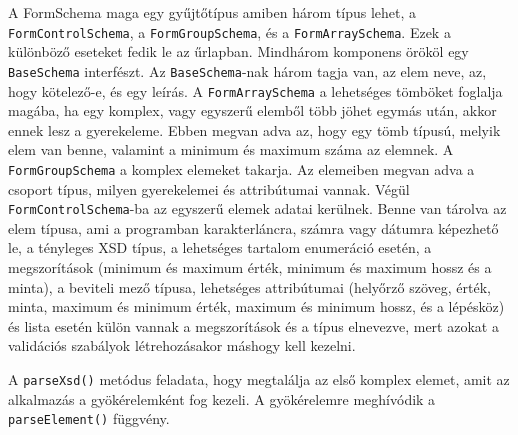 
A FormSchema maga egy gyűjtőtípus amiben három típus lehet, a \texttt{FormControlSchema}, a \texttt{FormGroupSchema}, és a \texttt{FormArraySchema}. Ezek a különböző eseteket fedik le az űrlapban. Mindhárom komponens örököl egy \texttt{BaseSchema} interfészt. Az \texttt{BaseSchema}-nak három tagja van, az elem neve, az, hogy kötelező-e, és egy leírás. A \texttt{FormArraySchema} a lehetséges tömböket foglalja magába, ha egy komplex, vagy egyszerű elemből több jöhet egymás után, akkor ennek lesz a gyerekeleme. Ebben megvan adva az, hogy egy tömb típusú, melyik elem van benne, valamint a minimum és maximum száma az elemnek. A \texttt{FormGroupSchema} a komplex elemeket takarja. Az elemeiben megvan adva a csoport típus, milyen gyerekelemei és attribútumai vannak. Végül \texttt{FormControlSchema}-ba az egyszerű elemek adatai kerülnek. Benne van tárolva az elem típusa, ami a programban karakterláncra, számra vagy dátumra képezhető le, a tényleges XSD típus, a lehetséges tartalom enumeráció esetén, a megszorítások (minimum és maximum érték, minimum és maximum hossz és a minta), a beviteli mező típusa, lehetséges attribútumai (helyőrző szöveg, érték, minta, maximum és minimum érték, maximum és minimum hossz, és a lépésköz) és lista esetén külön vannak a megszorítások és a típus elnevezve, mert azokat a validációs szabályok létrehozásakor máshogy kell kezelni.

A \texttt{parseXsd()} metódus feladata, hogy megtalálja az első komplex elemet, amit az alkalmazás a gyökérelemként fog kezeli. A gyökérelemre meghívódik a \texttt{parseElement()} függvény.


